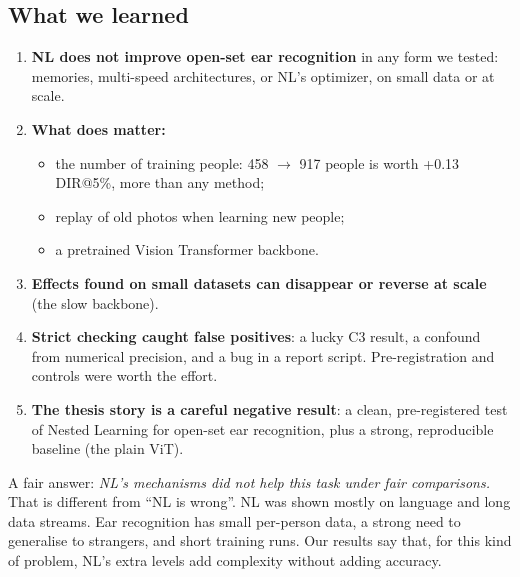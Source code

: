\documentclass[11pt,a4paper]{article}
\begin{document}
\subsection{What we learned}
\begin{enumerate}
  \item \textbf{NL does not improve open-set ear recognition} in any form we tested: memories, multi-speed architectures, or NL's optimizer, on small data or at scale.
  \item \textbf{What does matter:}
  \begin{itemize}
    \item the number of training people: 458 $\to$ 917 people is worth +0.13 DIR@5\%, more than any method;
    \item replay of old photos when learning new people;
    \item a pretrained Vision Transformer backbone.
  \end{itemize}
  \item \textbf{Effects found on small datasets can disappear or reverse at scale} (the slow backbone).
  \item \textbf{Strict checking caught false positives}: a lucky C3 result, a confound from numerical precision, and a bug in a report script. Pre-registration and controls were worth the effort.
  \item \textbf{The thesis story is a careful negative result}: a clean, pre-registered test of Nested Learning for open-set ear recognition, plus a strong, reproducible baseline (the plain ViT).
\end{enumerate}

\begin{careful}
A fair answer: \emph{NL's mechanisms did not help this task under fair comparisons.} That is different from ``NL is wrong''. NL was shown mostly on language and long data streams. Ear recognition has small per-person data, a strong need to generalise to strangers, and short training runs. Our results say that, for this kind of problem, NL's extra levels add complexity without adding accuracy.
\end{careful}
\end{document}
